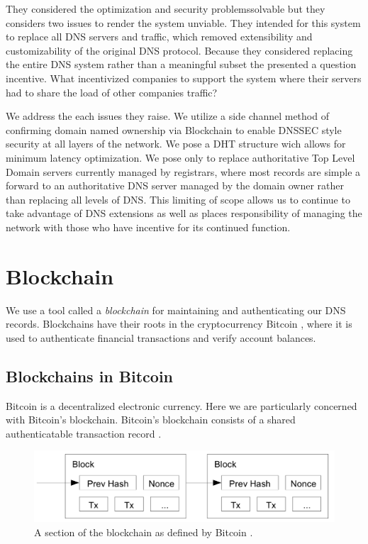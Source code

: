 \documentclass[11pt]{IEEEtran} %
\begin{document}
They considered the optimization and security problemssolvable but they considers two issues to render the system unviable. They intended for this system to replace all DNS servers and traffic, which removed extensibility and customizability of the original DNS protocol. Because they considered replacing the entire DNS system rather than a meaningful subset the presented a question incentive. What incentivized companies to support the system where their servers had to share the load of other companies traffic?
 
 
We address the each issues they raise. We utilize a side channel method of confirming domain named ownership via Blockchain to enable DNSSEC style security at all layers of the network. We pose a DHT structure wich allows for minimum latency optimization. We pose only to replace authoritative Top Level Domain servers currently managed by registrars, where most records are simple a forward to an authoritative DNS server managed by the domain owner rather than replacing all levels of DNS. This limiting of scope allows us to continue to take advantage of DNS extensions as well as places responsibility of managing the network with those who have incentive for its continued function.


\section{Blockchain}
We use a tool called a \emph{blockchain} for maintaining and  authenticating our DNS records.  Blockchains have their roots in the cryptocurrency Bitcoin \cite{bitcoin}, where it is used to authenticate financial transactions and verify account balances.

\subsection{Blockchains in Bitcoin}
Bitcoin is a decentralized electronic currency. Here we are particularly concerned with Bitcoin's blockchain. Bitcoin's blockchain consists of a shared authenticatable transaction record \cite{namecoin}  \cite{bitcoin} .


\begin{figure}
    \includegraphics[width=\linewidth]{blockchain}
    \caption{A section of the blockchain as defined by Bitcoin \cite{bitcoin}.}
    \label{blockchain}
\end{figure}
\end{document}
